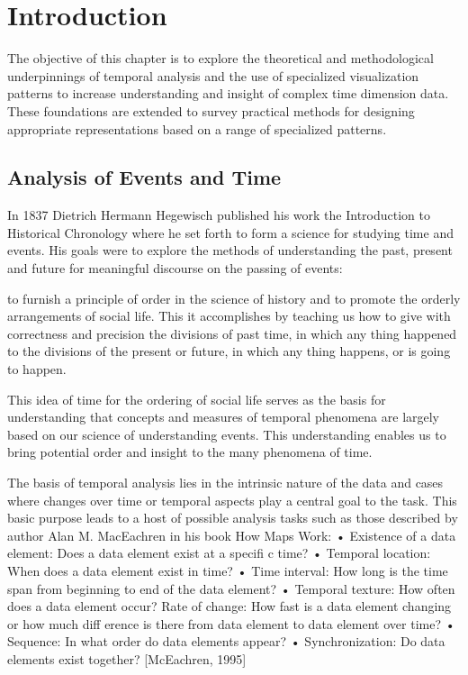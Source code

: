 \section{Introduction}\label{charts-intro}

The objective of this chapter is to explore the theoretical and methodological underpinnings of
temporal analysis and the use of specialized visualization patterns to increase understanding
and insight of complex time dimension data. These foundations are extended to survey practical
methods for designing appropriate representations based on a range of specialized patterns.

\subsection{Analysis of Events and Time}\label{size-by-value}

In 1837 Dietrich Hermann Hegewisch published his work the Introduction to Historical Chronology where he set
forth to form a science for studying time and events. His goals were to explore the methods of understanding
the past, present and future for meaningful discourse on the passing of events:

to furnish a principle of order in the science of history and to promote the orderly arrangements
of social life. This it accomplishes by teaching us how to give with correctness and precision the
divisions of past time, in which any thing happened to the divisions of the present or future, in
which any thing happens, or is going to happen.

This idea of time for the ordering of social life serves as the basis for understanding that concepts and measures
of temporal phenomena are largely based on our science of understanding events. This understanding
enables us to bring potential order and insight to the many phenomena of time.

The basis of temporal analysis lies in the intrinsic nature of the data and cases where changes over time or
temporal aspects play a central goal to the task. This basic purpose leads to a host of possible analysis tasks
such as those described by author Alan M. MacEachren in his book How Maps Work:
• Existence of a data element: Does a data element exist at a specifi c time?
• Temporal location: When does a data element exist in time?
• Time interval: How long is the time span from beginning to end of the data element?
• Temporal texture: How often does a data element occur?
Rate of change: How fast is a data element changing or how much diff erence is there from data
element to data element over time?
• Sequence: In what order do data elements appear?
• Synchronization: Do data elements exist together? [McEachren, 1995]

